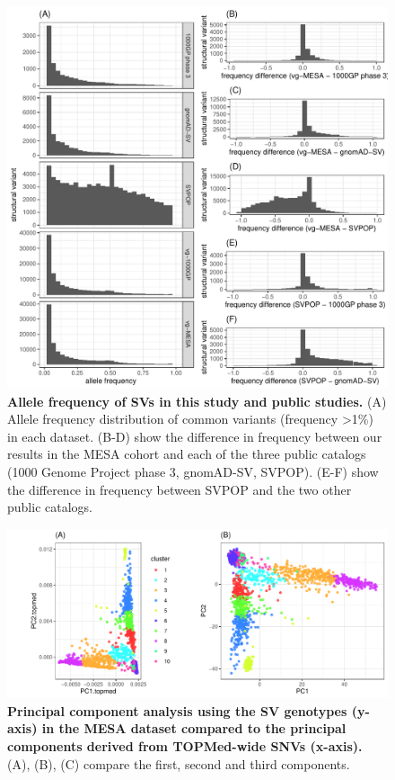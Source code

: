 \documentclass[11pt]{ucscthesis}
\begin{document}
\begin{figure}[p]
  \includegraphics[width=\linewidth]{fig-sv-freq-comp.pdf}
  \caption[Allele frequency of SVs in this study and public studies]{{\bf Allele frequency of SVs in this study and public studies.}
    (A) Allele frequency distribution of common variants (frequency >1\%) in each dataset.
    (B-D) show the difference in frequency between our results in the MESA cohort and each of the three public catalogs (1000 Genome Project phase 3, gnomAD-SV, SVPOP).
    (E-F) show the difference in frequency between SVPOP and the two other public catalogs.}
  \label{fig:sv-freq-comp}
\end{figure}

\begin{figure}[p]
  \includegraphics[width=\linewidth, page=3]{fig-sv-mesa-pcs.pdf}
  \caption[Principal component analysis using the SV genotypes or SNVs in the MESA dataset]{{\bf Principal component analysis using the SV genotypes (y-axis) in the MESA dataset compared to the principal components derived from TOPMed-wide SNVs (x-axis).}
    (A), (B), (C) compare the first, second and third components.}
  \label{fig:mesa-topmed-pcs}
\end{figure}
\end{document}
